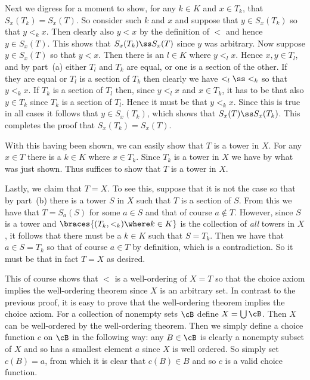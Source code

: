 {{    Next we digress for a moment to show, for any $k \in K$ and $x \in T_k$, that $S_x(T_k) = S_x(T)$.
    So consider such $k$ and $x$ and suppose that $y \in S_x(T_k)$ so that $y <_k x$.
    Then clearly also $y < x$ by the definition of $<$ and hence $y \in S_x(T)$.
    This shows that $S_x(T_k) \ss S_x(T)$ since $y$ was arbitrary.
    Now suppose $y \in S_x(T)$ so that $y < x$.
    Then there is an $l \in K$ where $y <_l x$.
    Hence $x,y \in T_l$, and by part~(a) either $T_l$ and $T_k$ are equal, or one is a section of the other.
    If they are equal or $T_l$ is a section of $T_k$ then clearly we have $<_l \ss <_k$ so that $y <_k x$.
    If $T_k$ is a section of $T_l$ then, since $y <_l x$ and $x \in T_k$, it has to be that also $y \in T_k$ since $T_k$ is a section of $T_l$.
    Hence it must be that $y <_k x$.
    Since this is true in all cases it follows that $y \in S_x(T_k)$, which shows that $S_x(T) \ss S_x(T_k)$.
    This completes the proof that $S_x(T_k) = S_x(T)$.

    With this having been shown, we can easily show that $T$ is a tower in $X$.
    For any $x \in T$ there is a $k \in K$ where $x \in T_k$.
    Since $T_k$ is a tower in $X$ we have
    by what was just shown.
    Thus suffices to show that $T$ is a tower in $X$.

    Lastly, we claim that $T = X$.
    To see this, suppose that it is not the case so that by part~(b) there is a tower $S$ in $X$ such that $T$ is a section of $S$.
    From this we have that $T = S_a(S)$ for some $a \in S$ and that of course $a \notin T$.
    However, since $S$ is a tower and $\braces{(T_k,<_k) \where k \in K}$ is the collection of \emph{all} towers in $X$, it follows that there must be a $k \in K$ such that $S = T_k$.
    Then we have that $a \in S = T_k$ so that of course $a \in T$ by definition, which is a contradiction.
    So it must be that in fact $T = X$ as desired.

    This of course shows that $<$ is a well-ordering of $X = T$ so that the choice axiom implies the well-ordering theorem since $X$ is an arbitrary set.
    In contrast to the previous proof, it is easy to prove that the well-ordering theorem implies the choice axiom.
    For a collection of nonempty sets $\cB$ define $X = \bigcup \cB$.
    Then $X$ can be well-ordered by the well-ordering theorem.
    Then we simply define a choice function $c$ on $\cB$ in the following way: any $B \in \cB$ is clearly a nonempty subset of $X$ and so has a smallest element $a$ since $X$ is well ordered.
    So simply set $c(B) = a$, from which it is clear that $c(B) \in B$ and so $c$ is a valid choice function.
  }
}

